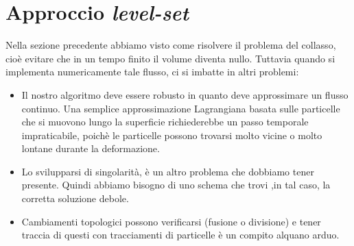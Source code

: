 \section{Approccio \emph{level-set}}  

Nella sezione precedente abbiamo visto come risolvere il problema del collasso, cioè evitare che in un tempo finito il volume diventa nullo. Tuttavia quando si implementa numericamente tale flusso, ci si imbatte in altri problemi:
\begin{itemize}

  \item Il nostro algoritmo deve essere robusto in quanto deve approssimare un flusso continuo. Una semplice approssimazione Lagrangiana basata sulle particelle che si muovono lungo la superficie richiederebbe un passo temporale impraticabile, poichè le particelle possono trovarsi molto vicine o molto lontane durante la deformazione.

   \item Lo svilupparsi di singolarità, è un altro problema che dobbiamo tener presente. Quindi abbiamo bisogno di uno schema che trovi ,in tal caso, la corretta soluzione debole.
   
   \item Cambiamenti topologici possono verificarsi (fusione o divisione) e tener traccia di questi con tracciamenti di particelle è un compito alquano arduo.

\end{itemize}


